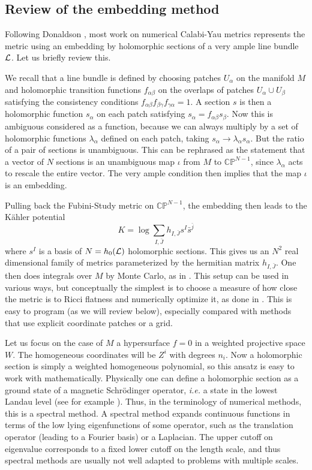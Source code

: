 \documentclass[12pt]{article}
\def\IC{\mathbb{C}}
\def\IP{\mathbb{P}}
\def\CL {{\cal L}}
\newcommand{\be}{\begin{equation}}
\newcommand{\ee}{\end{equation}}
\def\bj{{\bar{j}}}
\def\bs{{\bar{s}}}
\def\bJ{{\bar{J}}}
\begin{document}
\subsection{ Review of the embedding method }

Following Donaldson \cite{Donaldson}, most work on numerical Calabi-Yau metrics
represents the metric using an embedding by holomorphic sections of a very ample line bundle $\CL$.
Let us briefly review this.

We recall that a line bundle is defined by choosing patches $U_\alpha$ on the manifold $M$ and holomorphic transition
functions $f_{\alpha\beta}$ on the overlaps of patches $U_\alpha\cup U_\beta$ satisfying the
consistency conditions $f_{\alpha\beta}f_{\beta\gamma}f_{\gamma\alpha}=1$.  A section $s$ is then a holomorphic
function $s_\alpha$ on each patch satisfying $s_\alpha=f_{\alpha\beta}s_\beta$.  Now this is ambiguous
considered as a function, because we can always multiply by a set of holomorphic functions $\lambda_\alpha$
defined on each patch, taking $s_\alpha\rightarrow \lambda_\alpha s_\alpha$.  But the ratio of a pair of sections is
unambiguous.  This can be rephrased as the statement that a vector of $N$ sections is an unambiguous map $\iota$
from $M$ to $\IC\IP^{N-1}$, since $\lambda_\alpha$ acts to rescale the entire vector.
The very ample condition then implies that the map $\iota$ is an embedding.

Pulling back the Fubini-Study metric on $\IC\IP^{N-1}$, 
the embedding then leads to the K\"ahler potential
\be \label{eq:a1}
K = \log \sum_{I,\bJ} h_{I,\bJ} s^I \bs^\bj
\ee
where $s^I$ is a basis of $N=h_0(\CL)$ holomorphic sections.  This gives us an $N^2$ real dimensional
family of metrics parameterized by the hermitian matrix $h_{I,\bJ}$.
One then does integrals over $M$ by Monte Carlo, as in \cite{Douglas:2006rr}.
This setup can be used in various ways, but conceptually the simplest is to choose a measure of how
close the metric is to Ricci flatness and numerically optimize it, as done in \cite{Headrick:2009jz}.
This is easy to program (as we will review
below), especially compared with methods that use explicit coordinate patches or a grid.

Let us focus on the case of $M$ a hypersurface $f=0$ in a weighted projective space $W$.
The homogeneous coordinates will be $Z^i$ with degrees $n_i$.
Now a holomorphic section is simply
a weighted homogeneous polynomial, so this ansatz is easy to work with mathematically.
Physically one can define a holomorphic section as a 
ground state of a magnetic Schr\"odinger operator, {\it i.e.} a state in the lowest Landau level
(see for example \cite{Douglas:2008pz}).
Thus, in the terminology of numerical methods, this is a spectral method.  A spectral method expands
continuous functions in terms of the low lying eigenfunctions of some operator, such as the
translation operator (leading to a Fourier basis) or a Laplacian.  The upper cutoff on eigenvalue
corresponds to a fixed lower cutoff on the length scale, and thus 
spectral methods are usually not well adapted to problems with multiple scales.
\end{document}
